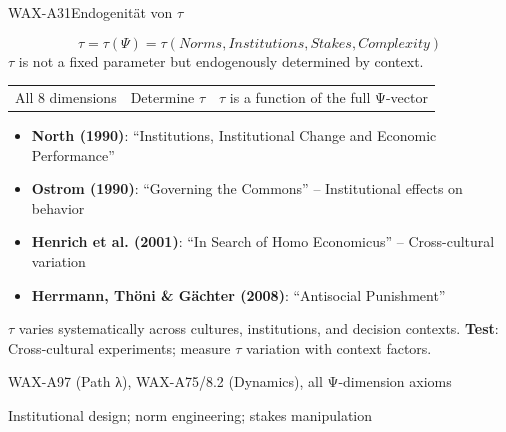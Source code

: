 \begin{axiomspec}{WAX-A31}{Endogenität von $\tau$}

\begin{equation}
\tau = \tau(\Psi) = \tau(Norms, Institutions, Stakes, Complexity)
\end{equation}
$\tau$ is not a fixed parameter but endogenously determined by context.

\begin{tabular}{lll}
All 8 dimensions & Determine $\tau$ & $\tau$ is a function of the full Ψ-vector \\
\end{tabular}

\begin{itemize}
\item \textbf{North (1990)}: ``Institutions, Institutional Change and Economic Performance''
\item \textbf{Ostrom (1990)}: ``Governing the Commons'' -- Institutional effects on behavior
\item \textbf{Henrich et al. (2001)}: ``In Search of Homo Economicus'' -- Cross-cultural variation
\item \textbf{Herrmann, Thöni \& Gächter (2008)}: ``Antisocial Punishment''
\end{itemize}

$\tau$ varies systematically across cultures, institutions, and decision contexts.
\textbf{Test}: Cross-cultural experiments; measure $\tau$ variation with context factors.

WAX-A97 (Path λ), WAX-A75/8.2 (Dynamics), all Ψ-dimension axioms

Institutional design; norm engineering; stakes manipulation

\end{axiomspec}


